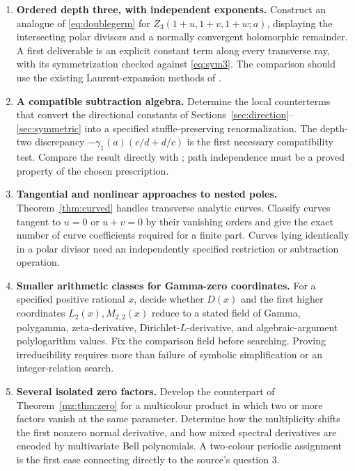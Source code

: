 \documentclass[11pt,letterpaper]{article}
\numberwithin{equation}{section}
\theoremstyle{plain}
\theoremstyle{definition}
\theoremstyle{remark}
\begin{document}
\begin{enumerate}[leftmargin=*,label=\textbf{Q\arabic*.},itemsep=8pt]
\item \textbf{Ordered depth three, with independent exponents.}
Construct an analogue of \eqref{eq:doublegerm} for
$Z_3(1+u,1+v,1+w;a)$, displaying the intersecting polar divisors and
a normally convergent holomorphic remainder. A first deliverable is
an explicit constant term along every transverse ray, with its
symmetrization checked against \eqref{eq:sym3}. The comparison should
use the existing Laurent-expansion methods of \cite{mow}.

\item \textbf{A compatible subtraction algebra.}
Determine the local counterterms that convert the directional constants
of Sections~\ref{sec:direction}--\ref{sec:symmetric} into a specified
stuffle-preserving renormalization. The depth-two discrepancy
$-\gamma_1(a)(c/d+d/c)$ is the first necessary compatibility test.
Compare the result directly with \cite{guozhang}; path independence
must be a proved property of the chosen prescription.

\item \textbf{Tangential and nonlinear approaches to nested poles.}
Theorem~\ref{thm:curved} handles transverse analytic curves. Classify
curves tangent to $u=0$ or $u+v=0$ by their vanishing orders and give
the exact number of curve coefficients required for a finite part.
Curves lying identically in a polar divisor need an independently
specified restriction or subtraction operation.

\item \textbf{Smaller arithmetic classes for Gamma-zero coordinates.}
For a specified positive rational $x$, decide whether $D(x)$ and the
first higher coordinates $L_2(x),M_{2,2}(x)$ reduce to a stated field
of Gamma, polygamma, zeta-derivative, Dirichlet-$L$-derivative, and
algebraic-argument polylogarithm values. Fix the comparison field
before searching. Proving irreducibility requires more than failure
of symbolic simplification or an integer-relation search.

\item \textbf{Several isolated zero factors.}
Develop the counterpart of Theorem~\ref{mz:thm:zero} for a
multicolour product in which two or more factors vanish at the same
parameter. Determine how the multiplicity shifts the first nonzero
normal derivative, and how mixed spectral derivatives are encoded
by multivariate Bell polynomials. A two-colour periodic assignment
is the first case connecting directly to the source's question 3.


\end{enumerate}
\end{document}
